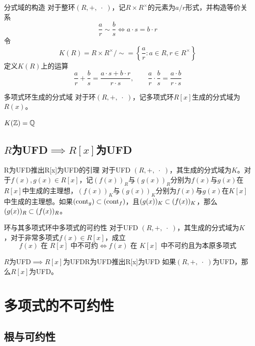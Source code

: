 \begin{theorem}{分式域的构造}
	对于整环$(R,+,\;\cdot \;)$，记$R\times R^{\times}$的元素为$a/r$形式，并构造等价关系%
	$$
	\frac{a}{r}\sim\frac{b}{s}
	\iff
	a\cdot s=b\cdot r
	$$
	令%
	$$
	K(R)=R\times R^{\times}/\sim
	=\left\{ \frac{a}{r}:a\in R,r\in R^\times \right\}
	$$
	定义$K(R)$上的运算%
	$$
	\frac{a}{r}+\frac{b}{s}=\frac{a\cdot s+b\cdot r}{r\cdot s},\qquad 
	\frac{a}{r}\cdot \frac{b}{s}=\frac{a\cdot b}{r\cdot s}
	$$
\end{theorem}

\begin{definition}{多项式环生成的分式域}
	对于环$(R,+,\;\cdot \;)$，记多项式环$R[x]$生成的分式域为$R(x)$。
\end{definition}

\begin{example}
	$K(\mathbb{Z})=\mathbb{Q}$
\end{example}

\subsection{$R$为UFD$\implies R[x]$为UFD}

\begin{lemma}{}{R为UFD推出R[x]为UFD的引理}
	对于UFD $(R,+,\;\cdot \;)$，其生成的分式域为$K$。对于$f(x),g(x)\in R[x]$，记$(f(x))_R$与$(g(x))_R$分别为$f(x)$与$g(x)$在$R[x]$中生成的主理想，$(f(x))_K$与$(g(x))_K$分别为$f(x)$与$g(x)$在$K[x]$中生成的主理想。如果$(\text{cont}_g)\subset(\text{cont}_f)$，且$(g(x))_K\subset (f(x))_K$，那么$(g(x))_R\subset (f(x))_R$。
\end{lemma}

\begin{theorem}{}{环与其多项式环中多项式的可约性}
	对于UFD $(R,+,\;\cdot \;)$，其生成的分式域为$K$，对于非常多项式$f(x)\in R[x]$，成立%
	$$
	f(x)\text{ 在 }R[x]\text{ 中不可约}
	\iff
	f(x)\text{ 在 }K[x]\text{ 中不可约且为本原多项式}
	$$
\end{theorem}

\begin{theorem}{$R$为UFD$\implies R[x]$为UFD}{R为UFD推出R[x]为UFD}
	如果$(R,+,\;\cdot \;)$为UFD，那么$R[x]$为UFD。
\end{theorem}

\section{多项式的不可约性}

\subsection{根与可约性}

